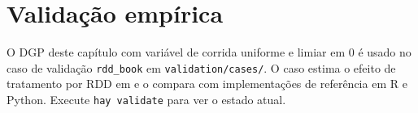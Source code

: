 \section{Validação empírica}

O DGP deste capítulo com variável de corrida uniforme e limiar em 0 é usado
no caso de validação \texttt{rdd\_book} em \texttt{validation/cases/}. O
caso estima o efeito de tratamento por RDD em \hayashi{} e o compara com
implementações de referência em R e Python. Execute \lstinline{hay validate}
para ver o estado atual.
